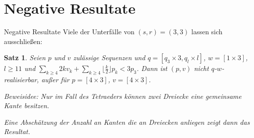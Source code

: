 \documentclass[10pt, notheorems]{beamer}
\newtheorem{theorem}{Satz}[section]
\begin{document}
\section{Negative Resultate}

\begin{frame}{Negative Resultate}
  Viele der Unterfälle von $(s, r) = (3, 3)$ lassen sich ausschließen:
  \begin{theorem}
    Seien $p$ und $v$ zulässige Sequenzen und $q = [q_3 \times 3, q_l \times l]$, $w = [1 \times 3]$, $l \geq 11$ und $\sum_{k \geq 4} 2k  v_k + \sum_{k \geq 4} \lfloor \tfrac{k}{2} \rfloor p_k < 3p_3$. Dann ist $(p, v)$ nicht $q$-$w$-realisierbar, außer für $p = [4 \times 3]$, $v = [4 \times 3]$.
    \medskip\\
    \pause
    { \normalfont
      Beweisidee: Nur im Fall des Tetraeders können zwei Dreiecke eine gemeinsame Kante besitzen.

      { \centering
        \par
      }
      Eine Abschätzung der Anzahl an Kanten die an Dreiecken anliegen zeigt dann das Resultat.
    }
  \end{theorem}
\end{frame}
\end{document}
